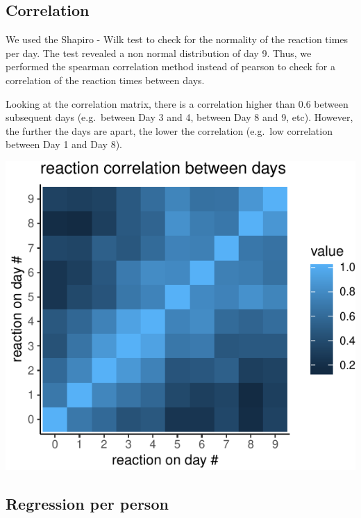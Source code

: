 \documentclass[
]{article}
\begin{document}
\hypertarget{correlation}{%
\subsection{Correlation}\label{correlation}}

We used the Shapiro - Wilk test to check for the normality of the
reaction times per day. The test revealed a non normal distribution of
day 9. Thus, we performed the spearman correlation method instead of
pearson to check for a correlation of the reaction times between days.

Looking at the correlation matrix, there is a correlation higher than
0.6 between subsequent days (e.g.~between Day 3 and 4, between Day 8 and
9, etc). However, the further the days are apart, the lower the
correlation (e.g.~low correlation between Day 1 and Day 8).


\begin{center}\includegraphics{common_sleep_files/figure-latex/spearman_tile-1} \end{center}

\hypertarget{regression-per-person}{%
\subsection{Regression per person}\label{regression-per-person}}
\end{document}
